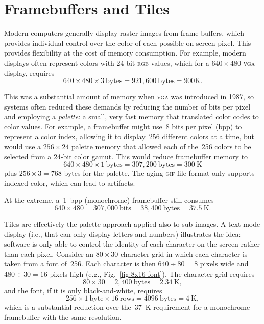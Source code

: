 \documentclass[11pt]{article}
\newcommand{\figref}[1]{Fig.~\ref{fig:#1}}
\begin{document}

\clearpage

\section{Framebuffers and Tiles}

Modern computers generally display raster images from frame buffers,
which provides individual control over the color of each possible
on-screen pixel.  This provides flexibility at the cost of memory
consumption.  For example, modern displays often represent colors with
24-bit \textsc{rgb} values, which for a $640\times480$ \textsc{vga}
display, requires
%
\[
640 \times 480 \times 3\ \text{bytes} = 921,600\ \text{bytes} = 900 \text{K}.
\]

This was a substantial amount of memory when \textsc{vga} was
introduced in 1987, so systems often reduced these demands by reducing
the number of bits per pixel and employing a \emph{palette}: a small,
very fast memory that translated color codes to color values.  For
example, a framebuffer might use~8 bits per pixel (bpp) to represent a
color index, allowing it to display~256 different colors at a time,
but would use a $256 \times 24$ palette memory that allowed each of
the~256 colors to be selected from a 24-bit color gamut.  This would
reduce framebuffer memory to
%
\[
640 \times 480 \times 1\ \text{bytes} = 307,200\ \text{bytes} =
300~\text{K}
\]
%
plus $256 \times 3 = 768$ bytes for the palette.  The aging
\textsc{gif} file format only supports indexed color, which can lead
to artifacts.

At the extreme, a~1~bpp (monochrome) framebuffer still consumes
%
\[
640 \times 480 = 307,000~\text{bits} = 38,400~\text{bytes} = 37.5~\text{K}.
\]

Tiles are effectively the palette approach applied also to sub-images.
A text-mode display (i.e., that can only display letters and numbers)
illustrates the idea: software is only able to control the identity of each character on the screen rather than each pixel.  Consider an $80\times
30$ character grid in which each character is taken from a font
of~256.  Each character is then $640 \div 80 = 8$ pixels wide and $480
\div 30 = 16$ pixels high (e.g., \figref{8x16-font}).  The character
grid requires
%
\[
80 \times 30 = 2,400~\text{bytes} = 2.34~\text{K},
\]
%
and the font, if it is only black-and-white, requires
%
\[
256 \times 1~\text{byte} \times 16~\text{rows} = 4096~\text{bytes} = 4~\text{K},
\]
%
which is a substantial reduction over the~37~K requirement for a
monochrome framebuffer with the same resolution.
\end{document}
